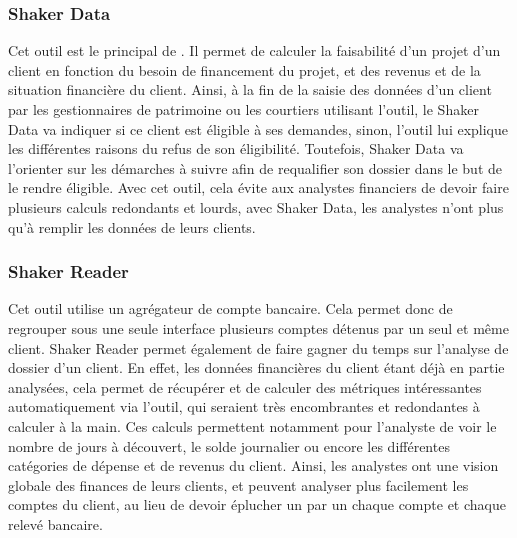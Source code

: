 \documentclass[12pt,oneside,noprintercorrection]{iut}
\begin{document}
\subsubsection{Shaker Data}
Cet outil est le principal de \gz{}. Il permet de calculer la faisabilité d'un projet d'un client en fonction du besoin de financement du projet, et des revenus et de la situation financière du client. Ainsi, à la fin de la saisie des données d'un client par les gestionnaires de patrimoine ou les courtiers utilisant l'outil, le Shaker Data va indiquer si ce client est éligible à ses demandes, sinon, l'outil lui explique les différentes raisons du refus de son éligibilité. Toutefois, Shaker Data va l’orienter sur les démarches à suivre afin de requalifier son dossier dans le but de le rendre éligible. Avec cet outil, cela évite aux analystes financiers de devoir faire plusieurs calculs redondants et lourds, avec Shaker Data, les analystes n'ont plus qu'à remplir les données de leurs clients.

\subsubsection{Shaker Reader}
Cet outil utilise un agrégateur de compte bancaire. Cela permet donc de regrouper sous une seule interface plusieurs comptes détenus par un seul et même client. Shaker Reader permet également de faire gagner du temps sur l'analyse de dossier d'un client. En effet, les données financières du client étant déjà en partie analysées, cela permet de récupérer et de calculer des métriques intéressantes automatiquement via l'outil, qui seraient très encombrantes et redondantes à calculer à la main. Ces calculs permettent notamment pour l'analyste de voir le nombre de jours à découvert, le solde journalier ou encore les différentes catégories de dépense et de revenus du client.  Ainsi, les analystes ont une vision globale des finances de leurs clients, et peuvent analyser plus facilement les comptes du client, au lieu de devoir éplucher un par un chaque compte et chaque relevé bancaire.
\clearpage
\end{document}
